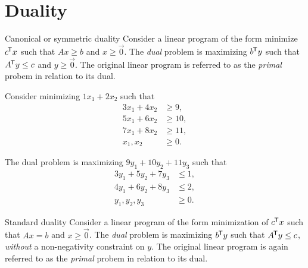 \section{Duality}

\begin{defn}{Canonical or symmetric duality}\proofbreak
    Consider a linear program of the form minimize $c^{\mkern-1.5mu\mathsf{T}}x$ such that $Ax \geq b$ and $x \geq \vec{0}$. The \emph{dual} problem is maximizing $b^{\mkern-1.5mu\mathsf{T}}y$ such that $A^{\mkern-1.5mu\mathsf{T}}y \leq c$ and $y \geq \vec{0}$. The original linear program is referred to as the \emph{primal} probem in relation to its dual.
\end{defn}

\begin{exmp}
    Consider minimizing $1x_1 + 2x_2$ such that
    \begin{align*}
        3x_1 + 4x_2 &\geq 9, \\
        5x_1 + 6x_2 &\geq 10, \\
        7x_1 + 8x_2 &\geq 11, \\
        x_1, x_2 &\geq 0.
    \end{align*}

    The dual problem is maximizing $9y_1 + 10y_2 + 11y_3$ such that
    \begin{align*}
        3y_1 + 5y_2 + 7y_3  &\leq 1, \\
        4y_1 + 6y_2 + 8y_3  &\leq 2, \\
        y_1, y_2, y_3 &\geq 0.
    \end{align*}
\end{exmp}

\begin{defn}{Standard duality}\proofbreak
    Consider a linear program of the form minimization of $c^{\mkern-1.5mu\mathsf{T}}x$ such that $Ax = b$ and $x \geq \vec{0}$. The \emph{dual} problem is maximizing $b^{\mkern-1.5mu\mathsf{T}}y$ such that $A^{\mkern-1.5mu\mathsf{T}}y \leq c$, \emph{without} a non-negativity constraint on $y$. The original linear program is again referred to as the \emph{primal} probem in relation to its dual.
\end{defn}

